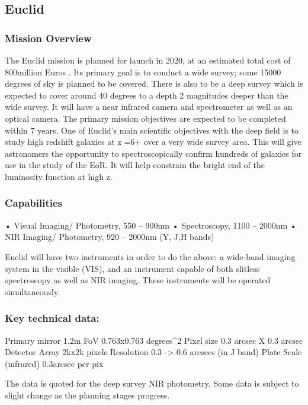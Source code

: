 \subsection{Euclid}
\subsubsection{Mission Overview}
The Euclid mission is planned for launch in 2020, at an estimated total cost of 800million Euros \cite{http://www.bbc.co.uk/news/science-environment-18503703} . Its
primary goal is to conduct a wide survey; some 15000 degrees of sky is planned to be covered. There is also to be a deep survey which is expected to cover around 40 degrees to a depth 2 magnitudes deeper than the wide survey. It will have a near infrared camera and spectrometer as well as an optical camera. The primary mission  objectives are expected to be completed within 7 years. One of Euclid’s main scientific objectives with the deep field is to study high redshift galaxies at z =6+ over a very wide survey area. This will give astronomers the opportunity to spectroscopically confirm hundreds of galaxies for use in the study of the EoR. It will help constrain the bright end of the luminosity function at high z.

\subsubsection{Capabilities}

• Visual Imaging/ Photometry, 550 – 900nm
• Spectroscopy, 1100 – 2000nm
• NIR Imaging/ Photometry, 920 – 2000nm (Y, J,H bands)

Euclid will have two instruments in order to do the above; a wide-band imaging system in the visible (VIS), and an instrument capable of both slitless spectroscopy as well as NIR imaging. These instruments will be operated simultaneously.

\subsubsection{Key technical data:}
Primary mirror		1.2m
FoV 			0.763x0.763 degrees^2
Pixel size		0.3 arcsec X 0.3 arcsec
Detector Array	2kx2k pixels
Resolution 		0.3 -> 0.6 arcsecs (in J band)
Plate Scale (infrared)	0.3arcsec per pix

The data is quoted for the deep survey NIR photometry. Some data is subject to slight change as the planning stages progress.